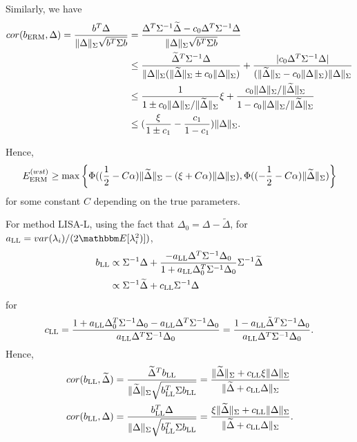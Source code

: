 Similarly, we have
\begin{align*}
   cor(b_{\textup{ERM}},\Delta)=  \frac{b^T\Delta}{\|\Delta\|_{\Sigma}\sqrt{b^T\Sigma b}}&=\frac{\Delta^T\Sigma^{-1}\widetilde{\Delta}-c_0\Delta^T\Sigma^{-1}\Delta}{\|\Delta\|_{\Sigma}\sqrt{b^T\Sigma b}}\\
    &\leq  \frac{\widetilde{\Delta}^T\Sigma^{-1}\Delta}{\|\Delta\|_{\Sigma}(\|\widetilde{\Delta}\|_{\Sigma}\pm c_0\|\Delta\|_{\Sigma})}+\frac{|c_0\Delta^T\Sigma^{-1}\Delta|}{(\|\widetilde{\Delta}\|_{\Sigma}- c_0\|\Delta\|_{\Sigma})\|\Delta\|_{\Sigma}}\\
    &\leq \frac{1}{1\pm c_0\|\Delta\|_{\Sigma}/\|\widetilde{\Delta}\|_{\Sigma}}\xi+\frac{c_0\|\Delta\|_{\Sigma}/\|\widetilde{\Delta}\|_{\Sigma}}{1-c_0\|\Delta\|_{\Sigma}/\|\widetilde{\Delta}\|_{\Sigma}}\\
    &\leq (\frac{\xi}{1\pm c_1}-\frac{c_1}{1-c_1})\|\Delta\|_{\Sigma}.
\end{align*}

Hence,
\begin{align}
\label{err0-lb}
    E_{\textup{ERM}}^{(wst)}\geq \max\left\{\Phi((\frac{1}{2}-C\alpha)\|\widetilde{\Delta}\|_{\Sigma}-(\xi+C\alpha)\|\Delta\|_{\Sigma}),\Phi((-\frac{1}{2}-C\alpha)\|\widetilde{\Delta}\|_{\Sigma})\right\}
\end{align}
 for some constant $C$ depending on the true parameters.


For method LISA-L, using the fact that $\Delta_0=\Delta-\widetilde{\Delta}$, for $a_{\textup{LL}}=var(\lam_i)/(2\E[\lam_i^2)])$,
\begin{align*}
 b_{\textup{LL}}&\propto\Sigma^{-1}\Delta+\frac{-a_{\textup{LL}}\Delta^T\Sigma^{-1}\Delta_0}{1+a_{\textup{LL}}\Delta_0^T\Sigma^{-1}\Delta_0}\Sigma^{-1}\widetilde{\Delta}\\
 &\propto \Sigma^{-1}\widetilde{\Delta}+c_{\textup{LL}}\Sigma^{-1}\Delta
 \end{align*}
 for 
 \[
    c_{\textup{LL}}=\frac{1+a_{\textup{LL}}\Delta_0^T\Sigma^{-1}\Delta_0-a_{\textup{LL}}\Delta^T\Sigma^{-1}\Delta_0}{a_{\textup{LL}}\Delta^T\Sigma^{-1}\Delta_0}=\frac{1-a_{\textup{LL}}\tilde{\Delta}^T\Sigma^{-1}\Delta_0}{a_{\textup{LL}}\Delta^T\Sigma^{-1}\Delta_0}.
 \]
 Hence,
 \begin{align*}
cor(b_{\textup{LL}},\widetilde{\Delta})&=\frac{ \widetilde{\Delta}^T b_{\textup{LL}}}{\|\widetilde{\Delta}\|_{\Sigma}\sqrt{b_{\textup{LL}}^T\Sigma b_{\textup{LL}}}} =\frac{\|\widetilde{\Delta}\|_{\Sigma}+c_{\textup{LL}}\xi\|\Delta\|_{\Sigma}}{\|\widetilde{\Delta}+c_{\textup{LL}}\Delta\|_{\Sigma}}\\
 cor(b_{\textup{LL}},\Delta)&=\frac{ b_{\textup{LL}}^T\Delta}{\|\Delta\|_{\Sigma}\sqrt{b_{\textup{LL}}^T\Sigma b_{\textup{LL}}}}=\frac{\xi\|\widetilde{\Delta}\|_{\Sigma}+c_{\textup{LL}}\|\Delta\|_{\Sigma}}{\|\widetilde{\Delta}+c_{\textup{LL}}\Delta\|_{\Sigma}}.
\end{align*}

